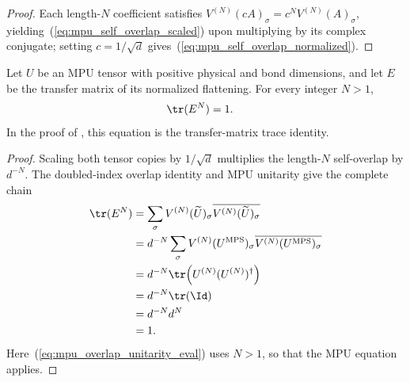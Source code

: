 \begin{proof}\leanok
    Each length-$N$ coefficient satisfies $V^{(N)}(cA)_\sigma = c^N V^{(N)}(A)_\sigma$, yielding~(\ref{eq:mpu_self_overlap_scaled}) upon multiplying by its complex conjugate; setting $c=1/\sqrt d$ gives~(\ref{eq:mpu_self_overlap_normalized}).
\end{proof}

\begin{lemma}
    \label{thm:mpu_normalized_transfer_trace}
    \leanok
    Let $U$ be an MPU tensor with positive physical and bond dimensions, and
    let $E$ be the transfer matrix of its normalized flattening.  For every
    integer $N>1$,
    \begin{align}
        \tr(E^N) & =1.
    \end{align}
    In the proof of \cite[Proposition~III.1]{Cirac2017MPU}, this equation is the transfer-matrix trace
    identity.
\end{lemma}

\begin{proof}\leanok
    Scaling both tensor copies by $1/\sqrt d$ multiplies the length-$N$
    self-overlap by $d^{-N}$.  The doubled-index overlap identity and MPU
    unitarity give the complete chain
    \begin{align}
        \tr(E^N)
         & =\sum_\sigma V^{(N)}(\widetilde U)_\sigma
        \overline{V^{(N)}(\widetilde U)_\sigma}                \notag                                \\
         & =d^{-N}\sum_\sigma V^{(N)}(U^{\mathrm{MPS}})_\sigma
        \overline{V^{(N)}(U^{\mathrm{MPS}})_\sigma}            \notag                                \\
         & =d^{-N}\tr\!\left(U^{(N)}(U^{(N)})^\dagger\right)   \notag                                \\
         & =d^{-N}\tr(\Id)                                     \label{eq:mpu_overlap_unitarity_eval} \\
         & =d^{-N}d^N                                          \notag                                \\
         & =1.                                                 \notag
    \end{align}
    Here~(\ref{eq:mpu_overlap_unitarity_eval}) uses $N>1$, so that the MPU equation applies.
\end{proof}

